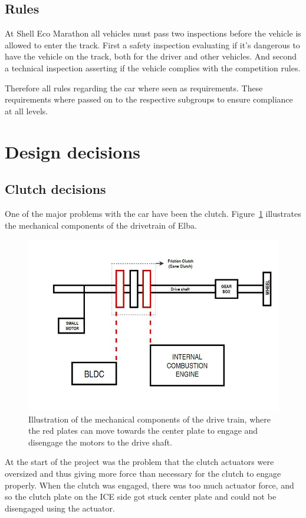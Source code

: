 \subsection{Rules}
At Shell Eco Marathon all vehicles must pass two inspections before the vehicle
is allowed to enter the track. First a safety inspection evaluating if it's
dangerous to have the vehicle on the track, both for the driver and other
vehicles. And second a technical inspection asserting if the vehicle complies
with the competition rules.

Therefore all rules regarding the car where seen as requirements. These requirements where passed on to the respective subgroups to ensure compliance at all levels. 

\section{Design decisions}
\subsection{Clutch decisions}

One of the major problems with the car have been the clutch.
Figure~\ref{fig:Drivetrain} illustrates the mechanical components of the
drivetrain of Elba.

\begin{figure}[H]
    \centering
    \includegraphics[width=1\textwidth]{./img/Drivetrain}
    \caption{Illustration of the mechanical components of the drive train, where
    the red plates can move towards the center plate to engage and disengage the
    motors to the drive shaft.}\label{fig:Drivetrain}
\end{figure}
At the start of the project was the problem that the clutch actuators were
oversized and thus giving more force than necessary for the clutch to engage
properly. When the clutch was engaged, there was too much actuator force, and so
the clutch plate on the ICE side got stuck center plate and could not be
disengaged using the actuator.

